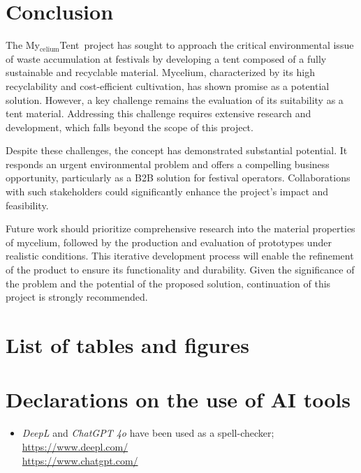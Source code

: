\documentclass{article}
\newcommand{\myc}{My$_{\text{celium}}$Tent}
\begin{document}
\section{Conclusion}
The \myc\ project has sought to approach the critical environmental issue of waste
accumulation at festivals by developing a tent composed of a fully sustainable and recyclable
material. Mycelium, characterized by its high recyclability and cost-efficient cultivation, has
shown promise as a potential solution. However, a key challenge remains the evaluation of its
suitability as a tent material. Addressing this challenge requires extensive research and
development, which falls beyond the scope of this project.

Despite these challenges, the concept has demonstrated substantial potential. It responds
an urgent environmental problem and offers a compelling business opportunity, particularly
as a B2B solution for festival operators. Collaborations with such stakeholders could
significantly enhance the project's impact and feasibility.

Future work should prioritize comprehensive research into the material properties of
mycelium, followed by the production and evaluation of prototypes under realistic
conditions. This iterative development process will enable the refinement of the
product to ensure its functionality and durability. Given the significance of the problem
and the potential of the proposed solution, continuation of this project is strongly
recommended.

\newpage
\section{List of tables and figures}
\listoftables

\listoffigures

\section{Declarations on the use of AI tools}
\begin{itemize}
    \item \textit{DeepL} and \textit{ChatGPT 4o} have been used as a spell-checker;\\
        \url{https://www.deepl.com/}\\
        \url{https://www.chatgpt.com/}
\end{itemize}

\setlength{\bibitemsep}{1.2\baselineskip}
\printbibliography
\end{document}
